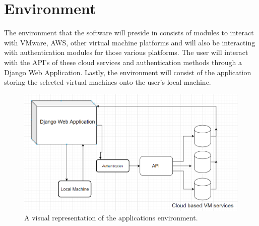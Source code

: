 \documentclass{article}
\begin{document}
    \section{Environment}

    The environment that the software will preside in consists of modules to interact with VMware, 
    AWS, other virtual machine platforms and will also be interacting with authentication modules for those
    various platforms. The user will interact with the API's of these cloud services and authentication
    methods through a Django Web Application. Lastly, the environment will consist of the application storing the selected
    virtual machines onto the user's local machine.

    \begin{figure}[h]
    \includegraphics[scale=.7]{diagram}
        \caption{A visual representation of the applications environment.}
    \end{figure}
\end{document}
